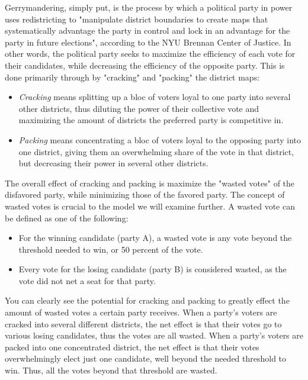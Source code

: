 \documentclass[sigconf]{acmart}
\begin{document}
Gerrymandering, simply put, is the process by which a political party in power uses redistricting to "manipulate district boundaries to create maps that systematically advantage the party in control and lock in an advantage for the party in future elections", according to the NYU Brennan Center of Justice.\cite{brennan} In other words, the political party seeks to maximize the efficiency of each vote for their candidates, while decreasing the efficiency of the opposite party. This is done primarily through by "cracking" and "packing" the district maps:
\begin{itemize}
    \item \textit{Cracking} means splitting up a bloc of voters loyal to one party into several other districts, thus diluting the power of their collective vote and maximizing the amount of districts the preferred party is competitive in.
    \item \textit{Packing} means concentrating a bloc of voters loyal to the opposing party into one district, giving them an overwhelming share of the vote in that district, but decreasing 
    their power in several other districts. \cite{chicago}
\end{itemize}
The overall effect of cracking and packing is maximize the "wasted votes" of the disfavored party, while minimizing those of the favored party. The concept of wasted votes is crucial to the model we will examine further. A wasted vote can be defined as one of the following:
\begin{itemize}
    \item For the winning candidate (party A), a wasted vote is any vote beyond the threshold needed to win, or 50 percent of the vote. 
    \item Every vote for the losing candidate (party B) is considered wasted, as the vote did not net a seat for that party.\cite{chicago}
\end{itemize}
You can clearly see the potential for cracking and packing to greatly effect the amount of wasted votes a certain party receives. When a party's voters are cracked into several different districts, the net effect is that their votes go to various losing candidates, thus the votes are all wasted. When a party's voters are packed into one concentrated district, the net effect is that their votes overwhelmingly elect just one candidate, well beyond the needed threshold to win. Thus, all the votes beyond that threshold are wasted.
\end{document}
